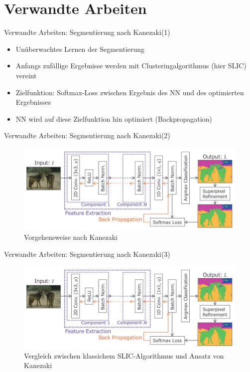 \documentclass[9pt]{beamer}
\begin{document}
\section{Verwandte Arbeiten}

\begin{frame}{Verwandte Arbeiten: Segmentierung nach Kanezaki\footnotemark[1] (1)}
\begin{itemize}
	\item Unüberwachtes Lernen der Segmentierung
	\item Anfangs zufällige Ergebnisse werden mit Clusteringalgorithmus (hier SLIC\footnotemark[2]) vereint
	\item Zielfunktion: Softmax-Loss zwischen Ergebnis des NN und des optimierten Ergebnisses
	\item NN wird auf diese Zielfunktion hin optimiert (Backpropagation)
\end{itemize}
\end{frame}

\begin{frame}{Verwandte Arbeiten: Segmentierung nach Kanezaki\footnotemark[1] (2)}
\begin{figure}
	\includegraphics[width=\textwidth,keepaspectratio]{kanezaki.png}
	\caption{Vorgehensweise nach Kanezaki}
\end{figure}
\end{frame}

\begin{frame}{Verwandte Arbeiten: Segmentierung nach Kanezaki\footnotemark[1] (3)}
\begin{figure}
	\includegraphics[width=\textwidth,keepaspectratio]{kanezaki.png}
	\caption{Vergleich zwischen klassichem SLIC-Algorithmus und Ansatz von Kanezaki}
\end{figure}
\end{frame}
\end{document}
